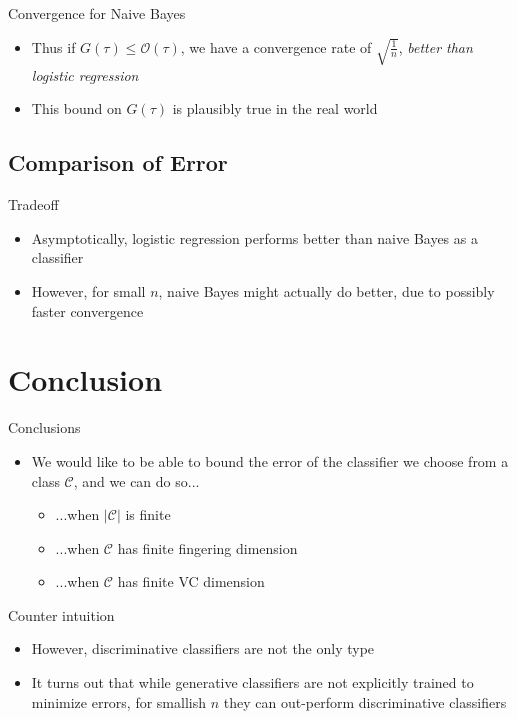 \documentclass{beamer}
\newcommand{\cls}{\mathcal{C}}
\newcommand{\abs}[1]{\left| #1 \right|}
\begin{document}
\begin{frame}{Convergence for Naive Bayes}
\begin{itemize}
\item Thus if $G(\tau) \leq \mathcal{O}(\tau)$, we have a convergence rate of $\sqrt{\frac1n}$, \emph{better than logistic regression}
\item This bound on $G(\tau)$ is plausibly true in the real world
\end{itemize}
\end{frame}

\subsection{Comparison of Error}
\begin{frame}{Tradeoff}
\begin{itemize}
\item Asymptotically, logistic regression performs better than naive Bayes as a classifier
\item However, for small $n$, naive Bayes might actually do better, due to possibly faster convergence
\end{itemize}
\end{frame}

\section{Conclusion}
\begin{frame}{Conclusions}
\begin{itemize}
\item We would like to be able to bound the error of the classifier we choose from a class $\cls$, and we can do so...
\begin{itemize}
\item ...when $\abs{\cls}$ is finite
\item ...when $\cls$ has finite fingering dimension
\item ...when $\cls$ has finite VC dimension
\end{itemize}
\end{itemize}
\end{frame}

\begin{frame}{Counter intuition}
\begin{itemize}
\item However, discriminative classifiers are not the only type
\item It turns out that while generative classifiers are not explicitly trained to minimize errors, for smallish $n$ they can out-perform discriminative classifiers
\end{itemize}
\end{frame}


\end{document}
